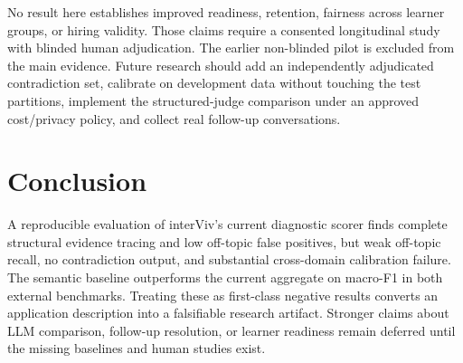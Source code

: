 \documentclass[conference,a4paper]{IEEEtran}
\begin{document}
No result here establishes improved readiness, retention, fairness across
learner groups, or hiring validity. Those claims require a consented
longitudinal study with blinded human adjudication. The earlier non-blinded
pilot is excluded from the main evidence. Future research should add an
independently adjudicated contradiction set, calibrate on development data
without touching the test partitions, implement the structured-judge
comparison under an approved cost/privacy policy, and collect real follow-up
conversations.

\section{Conclusion}

A reproducible evaluation of interViv's current diagnostic scorer finds
complete structural evidence tracing and low off-topic false positives, but
weak off-topic recall, no contradiction output, and substantial cross-domain
calibration failure. The semantic baseline outperforms the current aggregate on
macro-F1 in both external benchmarks. Treating these as first-class negative
results converts an application description into a falsifiable research
artifact. Stronger claims about LLM comparison, follow-up resolution, or
learner readiness remain deferred until the missing baselines and human studies
exist.
\end{document}
